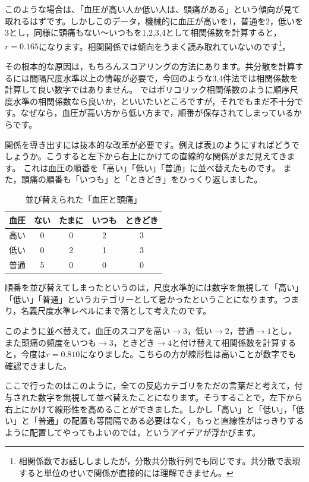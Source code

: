 \documentclass{ltjsbook}
\begin{document}
このような場合は、「血圧が高い人か低い人は、頭痛がある」という傾向が見て取れるはずです。しかしこのデータ，機械的に血圧が高いを1，普通を2，低いを3とし，同様に頭痛もない〜いつもを1,2,3,4として相関係数を計算すると，$r=0.165$になります。相関関係では傾向をうまく読み取れていないのです\footnote{相関係数でお話ししましたが，分散共分散行列でも同じです。共分散で表現すると単位のせいで関係が直接的には理解できません。}。

その根本的な原因は，もちろんスコアリングの方法にあります。共分散を計算するには間隔尺度水準以上の情報が必要で，今回のような3,4件法では相関係数を計算して良い数字ではありません。
ではポリコリック相関係数のように順序尺度水準の相関係数なら良いか，といいたいところですが，それでもまだ不十分です。なぜなら，血圧が高い方から低い方まで，順番が保存されてしまっているからです。

関係を導き出すには抜本的な改革が必要です。例えば表\ref{tbl::14_02}のようにすればどうでしょうか。こうすると左下から右上にかけての直線的な関係がまだ見えてきます。
これは血圧の順番を「高い」「低い」「普通」に並べ替えたものです。
また，頭痛の順番も「いつも」と「ときどき」をひっくり返しました。
\begin{table}[h]
	\begin{center}
	\caption{並び替えられた「血圧と頭痛」}
	\begin{tabular}{c|cccc}
	血圧&ない&たまに&いつも&ときどき\\
	\hline
	高い&0&0&2&3\\
	低い&0&2&1&3\\
	普通&5&0&0&0\\
	\end{tabular}
	\label{tbl::14_02}
	\end{center}
\end{table}
順番を並び替えてしまったというのは，尺度水準的には数字を無視して「高い」「低い」「普通」というカテゴリーとして暑かったということになります。つまり，名義尺度水準レベルにまで落として考えたのです。

このように並べ替えて，血圧のスコアを高い$\to3$，低い$\to2$，普通$\to1$とし，また頭痛の頻度をいつも$\to3$，ときどき$\to4$と付け替えて相関係数を計算すると，今度は$r=0.810$になりました。こちらの方が線形性は高いことが数字でも確認できました。

ここで行ったのはこのように，全ての反応カテゴリをただの言葉だと考えて，付与された数字を無視して並べ替えたことになります。そうすることで，左下から右上にかけて線形性を高めることができました。しかし「高い」と「低い」，「低い」と「普通」の配置も等間隔である必要はなく，もっと直線性がはっきりするように配置してやってもよいのでは，というアイデアが浮かびます。
\end{document}
